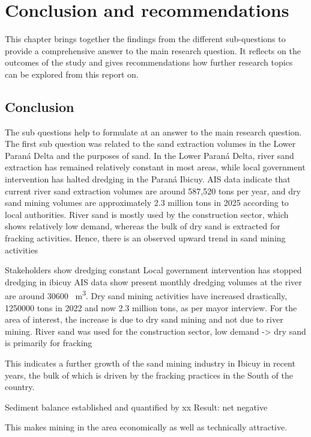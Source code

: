 \chapter{Conclusion and recommendations}
\label{chapter:conclusion}
This chapter brings together the findings from the different sub-questions to provide a comprehensive answer to the main research question. It reflects on the outcomes of the study and gives recommendations how further research topics can be explored from this report on.

\section{Conclusion}
The sub questions help to formulate at an answer to the main research question. The first sub question was related to the sand extraction volumes in the Lower Paraná Delta and the purposes of sand. In the Lower Paraná Delta, river sand extraction has remained relatively constant in most areas, while local government intervention has halted dredging in the Paraná Ibicuy. AIS data indicate that current river sand extraction volumes are around 587,520 tons per year, and dry sand mining volumes are approximately 2.3 million tons in 2025 according to local authorities.  River sand is mostly used by the construction sector, which shows relatively low demand, whereas the bulk of dry sand is extracted for fracking activities. Hence, there is an observed upward trend in sand mining activities 


Stakeholders show dredging constant
Local government intervention has stopped dredging in ibicuy
AIS data show present monthly dredging volumes at the river are around 30600 ~m\textsuperscript{3}. 
Dry sand mining activities have increased drastically, 1250000 tons in 2022 and now 2.3 million tons, as per mayor interview.
For the area of interest, the increase is due to dry sand mining and not due to river mining.
River sand was used for the construction sector, low demand -> dry sand is primarily for fracking




This indicates a further growth of the sand mining industry in Ibicuy in recent years, the bulk of which is driven by the fracking practices in the South of the country.

Sediment balance established and quantified by xx
Result: net negative

This makes mining in the area economically as well as technically attractive.


